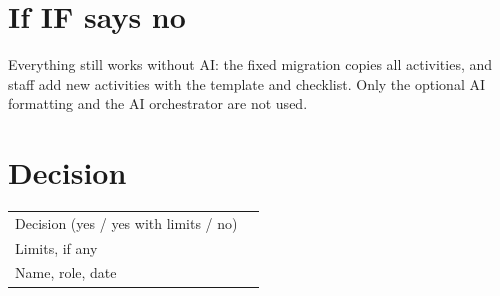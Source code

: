 \section{If IF says no}
Everything still works without AI: the fixed migration copies all activities, and staff add
new activities with the template and checklist. Only the optional AI formatting and the AI
orchestrator are not used.

\section{Decision}
\renewcommand{\arraystretch}{1.8}
\begin{tabularx}{\textwidth}{@{}P{5.5cm}L@{}}
\toprule
Decision (yes / yes with limits / no) & \\
Limits, if any & \\
Name, role, date & \\
\bottomrule
\end{tabularx}


